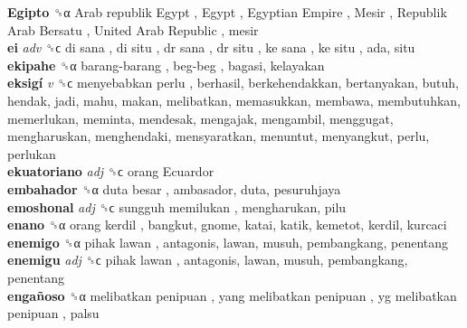 \textbf{Egipto} ␝α   Arab republik Egypt ,  Egypt ,  Egyptian Empire ,  Mesir ,  Republik Arab Bersatu ,  United Arab Republic , mesir  \\
\textbf{ei} \emph{adv}  ␝ϲ   di sana ,  di situ ,  dr sana ,  dr situ ,  ke sana ,  ke situ , ada, situ  \\
\textbf{ekipahe} ␝α   barang-barang ,  beg-beg , bagasi, kelayakan  \\
\textbf{eksigí} \emph{v}  ␝ϲ   menyebabkan perlu , berhasil, berkehendakkan, bertanyakan, butuh, hendak, jadi, mahu, makan, melibatkan, memasukkan, membawa, membutuhkan, memerlukan, meminta, mendesak, mengajak, mengambil, menggugat, mengharuskan, menghendaki, mensyaratkan, menuntut, menyangkut, perlu, perlukan  \\
\textbf{ekuatoriano} \emph{adj}  ␝ϲ   orang Ecuardor   \\
\textbf{embahador} ␝α   duta besar , ambasador, duta, pesuruhjaya  \\
\textbf{emoshonal} \emph{adj}  ␝ϲ   sungguh memilukan , mengharukan, pilu  \\
\textbf{enano} ␝α   orang kerdil , bangkut, gnome, katai, katik, kemetot, kerdil, kurcaci  \\
\textbf{enemigo} ␝α   pihak lawan , antagonis, lawan, musuh, pembangkang, penentang  \\
\textbf{enemigu} \emph{adj}  ␝ϲ   pihak lawan , antagonis, lawan, musuh, pembangkang, penentang  \\
\textbf{engañoso} ␝α   melibatkan penipuan ,  yang melibatkan penipuan ,  yg melibatkan penipuan , palsu  \\
